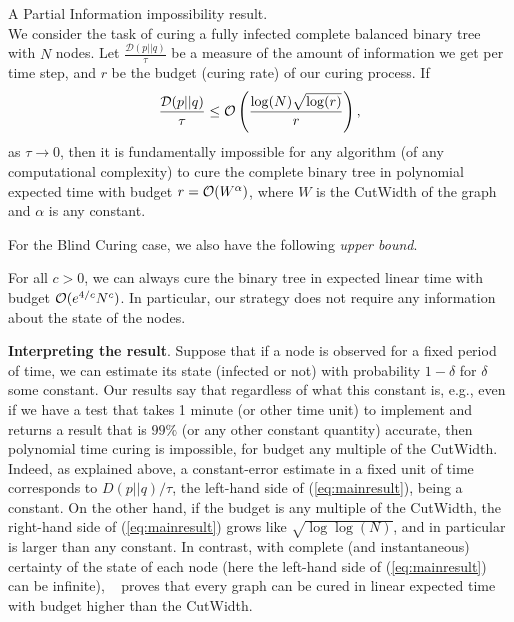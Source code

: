\begin{theorem}{A Partial Information impossibility result.} \label{th:partialInfo} \\
	We consider the task of curing a fully infected complete balanced binary tree with $N$ nodes. Let $\frac{\mathcal{D}(p||q)}{\tau}$ be a measure of the amount of information we get per time step, and $r$ be the budget (curing rate) of our curing process. If 
\begin{equation}
\frac{\mathcal{D}(p||q)}{\tau} \leq  \mathcal{O}\left(\frac{\log(N)\sqrt{\log(r)}}{r }\right),\label{eq:mainresult}
\end{equation}
as $\tau \to 0$, then it is fundamentally impossible for any algorithm (of any computational complexity) to cure the complete binary tree in polynomial expected time with budget $r = \mathcal{O}(W^{\alpha})$, where $W$ is the {\sc CutWidth} of the graph and $\alpha$ is any constant.
\end{theorem}

For the Blind Curing case, we also have the following {\em upper bound}.
\begin{theorem}\label{thm:new_upperbound} For all $c> 0$, we can always cure the binary tree in expected linear time with budget $\mathcal{O}(e^{4/c}N^c)$. In particular, our strategy does not require any information about the state of the nodes.
\end{theorem}


{\bf Interpreting the result}. Suppose that if a node is observed for a fixed period of time, we can estimate its state (infected or not) with probability $1-\delta$ for $\delta$ some constant. Our results say that regardless of what this constant is, e.g., even if we have a test that takes 1 minute (or other time unit) to implement and returns a result that is $99\%$ (or any other constant quantity) accurate, then polynomial time curing is impossible, for budget any multiple of the {\sc CutWidth}. Indeed, as explained above, a constant-error estimate in a fixed unit of time corresponds to $D(p||q)/\tau$, the left-hand side of (\ref{eq:mainresult}), being a constant. On the other hand, if the budget is any multiple of the {\sc CutWidth}, the right-hand side of (\ref{eq:mainresult}) grows like $\sqrt{\log\log(N)}$, and in particular is larger than any constant. In contrast, with complete (and instantaneous) certainty of the state of each node (here the left-hand side of (\ref{eq:mainresult}) can be infinite), ~\cite{Drakopoulos2014} proves that every graph can be cured in linear expected time with budget higher than the {\sc CutWidth}.


